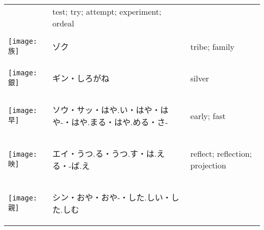 \documentclass[a4paper,12pt]{extarticle}
\begin{document}
\begin{longtable}{|lp{6cm}p{4cm}|}
&
test; try; attempt; experiment; ordeal
\\ 
\begin{minipage}{0.3\textwidth}
\centerline{
	\texttt{[image: 族]}
}
\end{minipage}
&
\begin{CJK}{UTF8}{min}ゾク\end{CJK}
&
tribe; family
\\ 
\begin{minipage}{0.3\textwidth}
\centerline{
	\texttt{[image: 銀]}
}
\end{minipage}
&
\begin{CJK}{UTF8}{min}ギン・しろがね\end{CJK}
&
silver
\\ 
\begin{minipage}{0.3\textwidth}
\centerline{
	\texttt{[image: 早]}
}
\end{minipage}
&
\begin{CJK}{UTF8}{min}ソウ・サッ・はや.い・はや・はや-・はや.まる・はや.める・さ-\end{CJK}
&
early; fast
\\ 
\begin{minipage}{0.3\textwidth}
\centerline{
	\texttt{[image: 映]}
}
\end{minipage}
&
\begin{CJK}{UTF8}{min}エイ・うつ.る・うつ.す・は.える・-ば.え\end{CJK}
&
reflect; reflection; projection
\\ 
\begin{minipage}{0.3\textwidth}
\centerline{
	\texttt{[image: 親]}
}
\end{minipage}
&
\begin{CJK}{UTF8}{min}シン・おや・おや-・した.しい・した.しむ\end{CJK}

\end{longtable}
\end{document}
